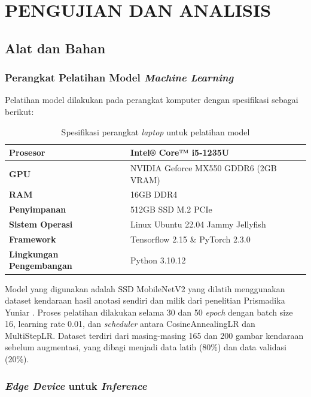 \chapter{PENGUJIAN DAN ANALISIS}
\label{chap:pengujiananalisis}

\section{Alat dan Bahan}
\label{sec:alatdanbahan}

\subsection{Perangkat Pelatihan Model \emph{Machine Learning}}

Pelatihan model dilakukan pada perangkat komputer dengan spesifikasi sebagai berikut:

\begin{table}[htbp]
  \centering
  \begin{tabular}{|l|l|}
  \hline
  \textbf{Prosesor} & Intel® Core™ i5-1235U \\
  \hline
  \textbf{GPU} & NVIDIA Geforce MX550 GDDR6 (2GB VRAM) \\
  \hline
  \textbf{RAM} & 16GB DDR4 \\
  \hline
  \textbf{Penyimpanan} & 512GB SSD M.2 PCIe \\
  \hline
  \textbf{Sistem Operasi} & Linux Ubuntu 22.04 Jammy Jellyfish \\
  \hline
  \textbf{Framework} & Tensorflow 2.15 \& PyTorch 2.3.0 \\
  \hline
  \textbf{Lingkungan Pengembangan} & Python 3.10.12 \\
  \hline
  \end{tabular}
  \caption{Spesifikasi perangkat \emph{laptop} untuk pelatihan model}
  \label{tab:training_laptop_specs}
\end{table}
Model yang digunakan adalah SSD MobileNetV2 yang dilatih menggunakan dataset kendaraan hasil anotasi sendiri dan milik dari penelitian Prismadika Yuniar \parencite*{prismadika2023}. Proses pelatihan dilakukan selama 30 dan 50 \emph{epoch} dengan batch size 16, learning rate 0.01, dan \emph{scheduler} antara CosineAnnealingLR dan MultiStepLR. Dataset terdiri dari masing-masing 165 dan 200 gambar kendaraan sebelum augmentasi, yang dibagi menjadi data latih (80\%) dan data validasi (20\%).

\subsection{\emph{Edge Device} untuk \emph{Inference}}

